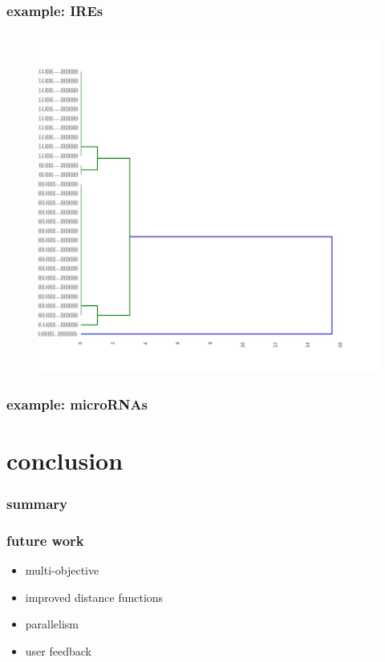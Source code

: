 \documentclass{beamer}
\begin{document}
\begin{frame}
	\frametitle{example: IREs}
	\begin{figure}
	\centering
	\includegraphics[scale=0.2]{figs/ires}
	\end{figure}
	
\end{frame}



\begin{frame}
	\frametitle{example: microRNAs}
	
\end{frame}


\section{conclusion}


\begin{frame}
	\frametitle{summary}
\end{frame}

\begin{frame}
	\frametitle{future work}
	\begin{itemize}
		\item multi-objective
		\item improved distance functions
		\item parallelism
		\item user feedback
	\end{itemize}
\end{frame}
\end{document}
